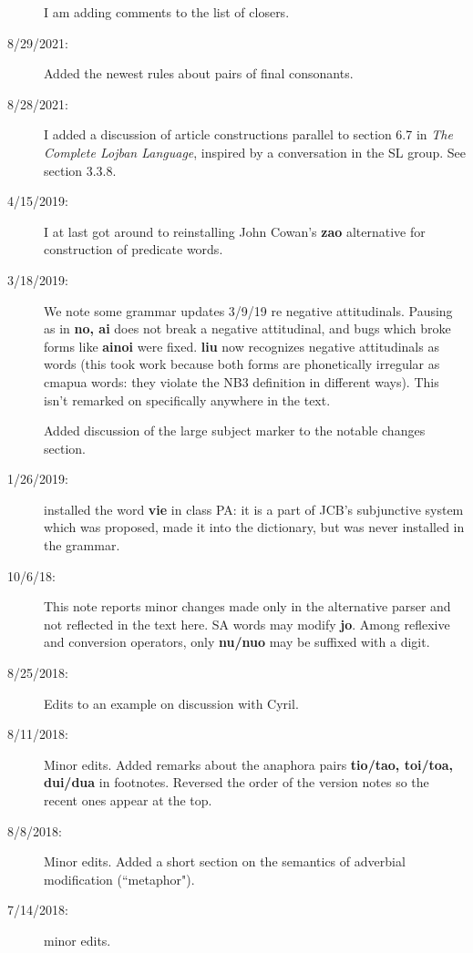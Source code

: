 \documentclass[12pt]{book}
\begin{document}
\begin{description}
I am adding comments to the list of closers.

\item[8/29/2021:]  Added the newest rules about pairs of final consonants.

\item[8/28/2021:]  I added a discussion of article constructions parallel to section 6.7 in {\em The Complete Lojban Language}, inspired by a conversation in the SL group.  See section 3.3.8.

\item[4/15/2019:]  I at last got around to reinstalling John Cowan's {\bf zao} alternative for construction of predicate words.

\item[3/18/2019:]  We note some grammar updates 3/9/19 re negative attitudinals.  Pausing as in {\bf no, ai} does not break a negative attitudinal, and bugs which broke forms
like {\bf ainoi} were fixed.  {\bf liu} now recognizes negative attitudinals as words (this took work because both forms are phonetically irregular as cmapua words:  they violate the NB3 definition in different ways).  This isn't remarked on specifically anywhere in the text.

Added discussion of the large subject marker to the notable changes section.

\item[1/26/2019:]  installed the word {\bf vie} in class PA:  it is a part of JCB's subjunctive system which was proposed, made it into the dictionary, but was never installed in the grammar.

\item[10/6/18:]  This note reports minor changes made only in the alternative parser and not reflected in the text here.  SA words may modify {\bf jo}.  Among reflexive and conversion operators, only {\bf nu/nuo} may be suffixed with a digit.

\item[8/25/2018:]  Edits to an example on discussion with Cyril.

\item[8/11/2018:]  Minor edits.  Added remarks about the anaphora pairs {\bf tio/tao, toi/toa, dui/dua} in footnotes.  Reversed the order of the version notes so the recent ones appear at the top.

\item[8/8/2018:]  Minor edits.  Added a short section on the semantics of adverbial modification (``metaphor").

\item[7/14/2018:]  minor edits.




\end{description}
\end{document}
